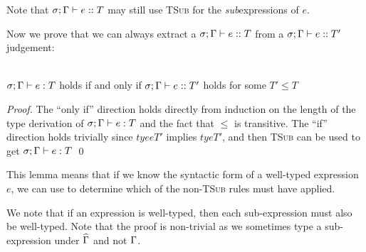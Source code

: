 \noindent Note that $\tye{e}{T}$ may still use \textsc{TSub} for the \emph{sub}expressions of $e$.

\LS

Now we prove that we can always extract a $\tye{e}{T}$ from a $\tye{e}{T'}$ judgement:

\SS\begin{Lemma}\ \\
	\indent $\ty{e}{T}$ holds if and only if $\tye{e}{T'}$ holds for some $T' \leq T$
\end{Lemma}
\SS\begin{proof}
	The ``only if'' direction holds directly from induction on the length of the type derivation of $\ty{e}{T}$ and the fact that $ \leq $ is transitive.
	The ``if'' direction holds trivially since $tye{e}{T'}$ implies $ty{e}{T'}$, and then \textsc{TSub} can be used to get $\ty{e}{T}$ 
\qed\end{proof}

\LS

This lemma means that if we know the syntactic form of a well-typed expression $e$, we can use  to determine which of the non-\textsc{TSub} rules must have applied.

We note that if an expression is well-typed, then each sub-expression must also be well-typed. Note that the proof is non-trivial as we sometimes type a sub-expression under $\widehat{\Gamma}$ and not $\Gamma$.

